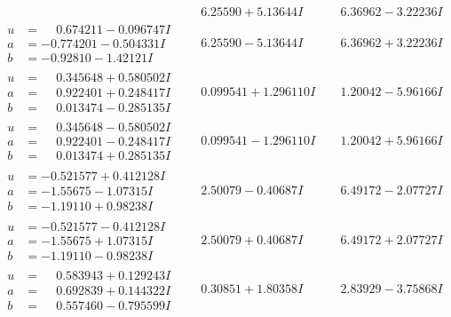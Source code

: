\documentclass[1p]{elsarticle_modified}
\theoremstyle{definition}
\begin{document}
$$\begin{array}{c|c|c}
 & \phantom{-}6.25590 + 5.13644 I & \phantom{-}6.36962 - 3.22236 I \\ \hline\begin{aligned}
u &= \phantom{-}0.674211 - 0.096747 I \\
a &= -0.774201 - 0.504331 I \\
b &= -0.92810 - 1.42121 I\end{aligned}
 & \phantom{-}6.25590 - 5.13644 I & \phantom{-}6.36962 + 3.22236 I \\ \hline\begin{aligned}
u &= \phantom{-}0.345648 + 0.580502 I \\
a &= \phantom{-}0.922401 + 0.248417 I \\
b &= \phantom{-}0.013474 - 0.285135 I\end{aligned}
 & \phantom{-}0.099541 + 1.296110 I & \phantom{-}1.20042 - 5.96166 I \\ \hline\begin{aligned}
u &= \phantom{-}0.345648 - 0.580502 I \\
a &= \phantom{-}0.922401 - 0.248417 I \\
b &= \phantom{-}0.013474 + 0.285135 I\end{aligned}
 & \phantom{-}0.099541 - 1.296110 I & \phantom{-}1.20042 + 5.96166 I \\ \hline\begin{aligned}
u &= -0.521577 + 0.412128 I \\
a &= -1.55675 - 1.07315 I \\
b &= -1.19110 + 0.98238 I\end{aligned}
 & \phantom{-}2.50079 - 0.40687 I & \phantom{-}6.49172 - 2.07727 I \\ \hline\begin{aligned}
u &= -0.521577 - 0.412128 I \\
a &= -1.55675 + 1.07315 I \\
b &= -1.19110 - 0.98238 I\end{aligned}
 & \phantom{-}2.50079 + 0.40687 I & \phantom{-}6.49172 + 2.07727 I \\ \hline\begin{aligned}
u &= \phantom{-}0.583943 + 0.129243 I \\
a &= \phantom{-}0.692839 + 0.144322 I \\
b &= \phantom{-}0.557460 - 0.795599 I\end{aligned}
 & \phantom{-}0.30851 + 1.80358 I & \phantom{-}2.83929 - 3.75868 I \\ \hline\begin{aligned}

\end{aligned}
\end{array}$$
\end{document}
